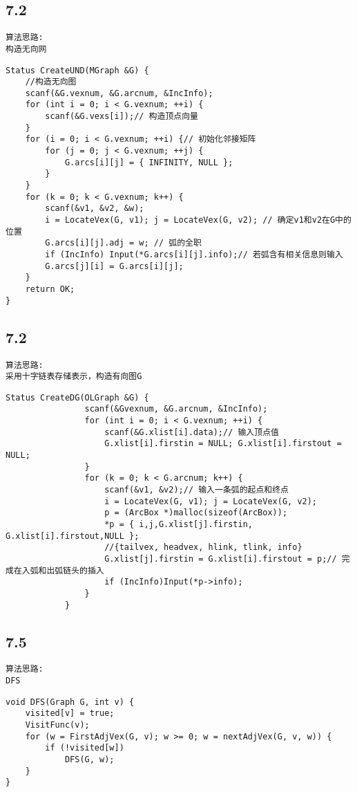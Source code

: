 \subsection{7.2}
\begin{lstlisting}[basicstyle=\small\ttfamily, caption={}, numbers=none]
算法思路:
构造无向网
\end{lstlisting}
\begin{lstlisting}[basicstyle=\small\ttfamily, caption={}, numbers=none]
Status CreateUND(MGraph &G) {
	//构造无向图
	scanf(&G.vexnum, &G.arcnum, &IncInfo);
	for (int i = 0; i < G.vexnum; ++i) {
		scanf(&G.vexs[i]);// 构造顶点向量
	}
	for (i = 0; i < G.vexnum; ++i) {// 初始化邻接矩阵
		for (j = 0; j < G.vexnum; ++j) {
			G.arcs[i][j] = { INFINITY, NULL };
		}
	}
	for (k = 0; k < G.vexnum; k++) {
		scanf(&v1, &v2, &w);
		i = LocateVex(G, v1); j = LocateVex(G, v2); // 确定v1和v2在G中的位置
		G.arcs[i][j].adj = w; // 弧的全职
		if (IncInfo) Input(*G.arcs[i][j].info);// 若弧含有相关信息则输入
		G.arcs[j][i] = G.arcs[i][j];
	}
	return OK;
}
\end{lstlisting}


\subsection{7.2}
\begin{lstlisting}[basicstyle=\small\ttfamily, caption={}, numbers=none]
算法思路:
采用十字链表存储表示，构造有向图G
\end{lstlisting}
\begin{lstlisting}[basicstyle=\small\ttfamily, caption={}, numbers=none]
			Status CreateDG(OLGraph &G) {
				scanf(&Gvexnum, &G.arcnum, &IncInfo);
				for (int i = 0; i < G.vexnum; ++i) {
					scanf(&G.xlist[i].data);// 输入顶点值
					G.xlist[i].firstin = NULL; G.xlist[i].firstout = NULL;
				}
				for (k = 0; k < G.arcnum; k++) {
					scanf(&v1, &v2);// 输入一条弧的起点和终点
					i = LocateVex(G, v1); j = LocateVex(G, v2);
					p = (ArcBox *)malloc(sizeof(ArcBox));
					*p = { i,j,G.xlist[j].firstin, G.xlist[i].firstout,NULL };
					//{tailvex, headvex, hlink, tlink, info}
					G.xlist[j].firstin = G.xlist[i].firstout = p;// 完成在入弧和出弧链头的插入
					if (IncInfo)Input(*p->info);
				}
			}

\end{lstlisting}


\subsection{7.5}
\begin{lstlisting}[basicstyle=\small\ttfamily, caption={}, numbers=none]
算法思路:
DFS
\end{lstlisting}
\begin{lstlisting}[basicstyle=\small\ttfamily, caption={}, numbers=none]
void DFS(Graph G, int v) {
	visited[v] = true;
	VisitFunc(v);
	for (w = FirstAdjVex(G, v); w >= 0; w = nextAdjVex(G, v, w)) {
		if (!visited[w])
			DFS(G, w);
	}
}
\end{lstlisting}


